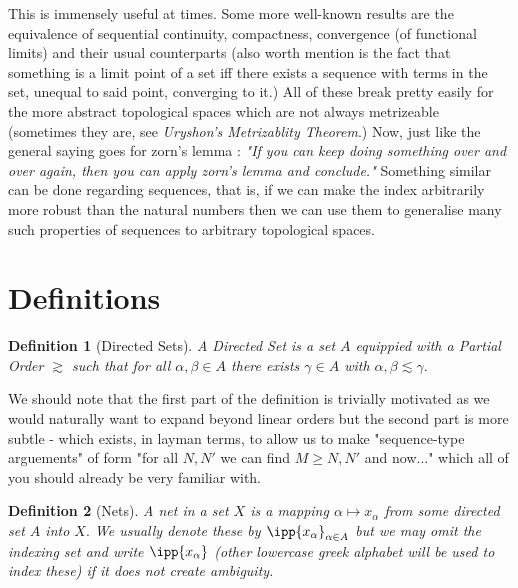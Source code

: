 \documentclass[12pt,english]{article}
\newtheorem{definition}{Definition}[section]
\begin{document}
This is immensely useful at times. Some more well-known results are the equivalence of sequential continuity, compactness, convergence (of functional limits) and their usual counterparts (also worth mention is the fact that something is a limit point of a set iff there exists a sequence with terms in the set, unequal to said point, converging to it.) All of these break pretty easily for the more abstract topological spaces which are not always metrizeable (sometimes they are, see \textit{Uryshon's Metrizablity Theorem}.) 
Now, just like the general saying goes for zorn's lemma : \textit{"If you can keep doing something over and over again, then you can apply zorn's lemma and conclude."} Something similar can be done regarding sequences, that is, if we can make the index arbitrarily more robust than the natural numbers then we can use them to generalise many such properties of sequences to arbitrary topological spaces. 
\section*{Definitions}
\begin{definition}[Directed Sets]
    A \textit{Directed Set} is a set $A$ equippied with a \textit{Partial Order} $\gtrsim$ such that for all $\alpha,\beta\in A$ there exists $\gamma\in A$ with $\alpha,\beta\lesssim\gamma.$ 
\end{definition}
We should note that the first part of the definition is trivially motivated as we would naturally want to expand beyond linear orders but the second part is more subtle - which exists, in layman terms, to allow us to make "sequence-type arguements" of form "for all $N,N'$ we can find $M\geq N,N'$ and now..." which all of you should already be very familiar with. 
\begin{definition}[Nets]
    A net in a set $X$ is a mapping $\alpha\mapsto x_\alpha$ from some directed set $A$ into $X.$ 
    We usually denote these by $\ipp{x_\alpha}_{\alpha\in A}$ but we may omit the indexing set and write $\ipp{x_\alpha}$ (other lowercase greek alphabet will be used to index these) if it does not create ambiguity. 
\end{definition}
\end{document}
